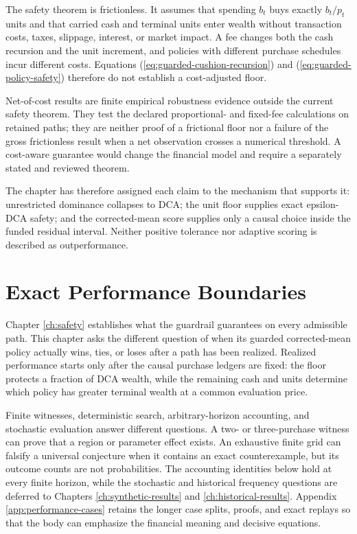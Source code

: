 \documentclass[12pt,a4paper,oneside]{report}
\begin{document}
The safety theorem is frictionless. It assumes that spending $b_t$ buys
exactly $b_t/p_t$ units and that carried cash and terminal units enter wealth
without transaction costs, taxes, slippage, interest, or market impact. A fee
changes both the cash recursion and the unit increment, and policies with
different purchase schedules incur different costs. Equations
(\ref{eq:guarded-cushion-recursion}) and
(\ref{eq:guarded-policy-safety}) therefore do not establish a cost-adjusted
floor.

Net-of-cost results are finite empirical robustness evidence outside the current safety theorem.
They test the declared proportional- and fixed-fee calculations on retained
paths; they are neither proof of a frictional floor nor a failure of the gross
frictionless result when a net observation crosses a numerical threshold. A
cost-aware guarantee would change the financial model and require a separately
stated and reviewed theorem.

The chapter has therefore assigned each claim to the mechanism that supports
it: unrestricted dominance collapses to DCA; the unit floor supplies exact
epsilon-DCA safety; and the corrected-mean score supplies only a causal choice
inside the funded residual interval. Neither positive tolerance nor adaptive
scoring is described as outperformance.

\chapter{Exact Performance Boundaries}
\label{ch:boundaries}

Chapter \ref{ch:safety} establishes what the guardrail guarantees on every
admissible path. This chapter asks the different question of when its guarded
corrected-mean policy actually wins, ties, or loses after a path has been
realized. Realized performance starts only after the causal purchase ledgers
are fixed: the floor protects a fraction of DCA wealth, while the remaining
cash and units determine which policy has greater terminal wealth at a common
evaluation price.

Finite witnesses, deterministic search, arbitrary-horizon accounting, and
stochastic evaluation answer different questions. A two- or three-purchase
witness can prove that a region or parameter effect exists. An exhaustive
finite grid can falsify a universal conjecture when it contains an exact
counterexample, but its outcome counts are not probabilities. The accounting
identities below hold at every finite horizon, while the stochastic and
historical frequency questions are deferred to Chapters
\ref{ch:synthetic-results} and \ref{ch:historical-results}. Appendix
\ref{app:performance-cases} retains the longer case splits, proofs, and exact
replays so that the body can emphasize the financial meaning and decisive
equations.
\end{document}
